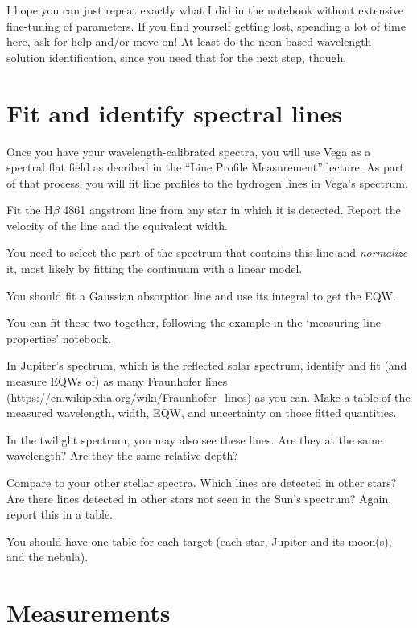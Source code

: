 \documentclass[11pt]{article}
\begin{document}
{I hope you can just repeat exactly what I did in the notebook without extensive
        fine-tuning of parameters.  If you find yourself getting lost, spending a lot of time here,
        ask for help and/or move on!  At least do the neon-based wavelength solution identification,
        since you need that for the next step, though.}





\section{Fit and identify spectral lines}

Once you have your wavelength-calibrated spectra, you will use Vega as a spectral flat field as decribed
in the ``Line Profile Measurement'' lecture.  As part of that process, you will fit line profiles to the
hydrogen lines in Vega's spectrum.

Fit the H$\beta$ 4861 angstrom line from any star in which it is detected.
Report the velocity of the line and the equivalent width.

{You need to select the part of the spectrum that contains this line and \emph{normalize} it, most likely by fitting the continuum with a linear model.}

{You should fit a Gaussian absorption line and use its integral to get the EQW.}

{You can fit these two together, following the example in the `measuring line properties' notebook.}



In Jupiter's spectrum, which is the reflected solar spectrum, identify and fit (and measure EQWs of) as many Fraunhofer lines
(\url{https://en.wikipedia.org/wiki/Fraunhofer_lines}) as you can.
Make a table of the measured wavelength, width, EQW, and uncertainty on
those fitted quantities.

In the twilight spectrum, you may also see these lines.  Are they at the same wavelength?  Are they the same relative depth?

Compare to your other stellar spectra.  Which lines are detected in other stars?  Are there lines detected in other stars not seen in the Sun's spectrum?
Again, report this in a table.

You should have one table for each target (each star, Jupiter and its moon(s), and the nebula).

\section{Measurements}
\end{document}
